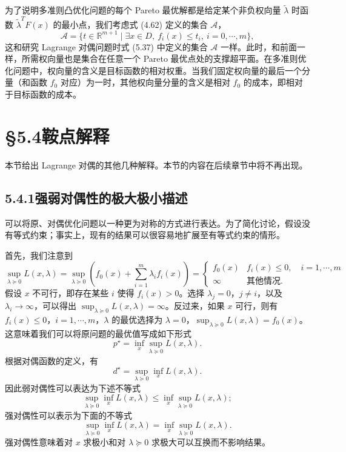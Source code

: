 \documentclass[UTF8, 12pt, fontset=fandol, oneside]{ctexart}
\begin{document}
为了说明多准则凸优化问题的每个 Pareto 最优解都是给定某个非负权向量 $\tilde{\lambda}$ 时函数 $\tilde{\lambda}^TF(x)$ 的最小点，我们考虑式 (4.62) 定义的集合 $\mathcal{A}$，
\[
\mathcal{A}=\{t\in\mathbb{R}^{m+1}\mid \exists x\in D,\ f_i(x)\leq t_i,\ i=0,\cdots,m\},
\]
这和研究 Lagrange 对偶问题时式 (5.37) 中定义的集合 $\mathcal{A}$ 一样。此时，和前面一样，所需权向量也是集合在任意一个 Pareto 最优点处的支撑超平面。在多准则优化问题中，权向量的含义是目标函数的相对权重。当我们固定权向量的最后一个分量（和函数 $f_0$ 对应）为一时，其他权向量分量的含义是相对 $f_0$ 的成本，即相对于目标函数的成本。

\section*{§5.4\quad 鞍点解释}

本节给出 Lagrange 对偶的其他几种解释。本节的内容在后续章节中将不再出现。

\subsection*{5.4.1\quad 强弱对偶性的极大极小描述}

可以将原、对偶优化问题以一种更为对称的方式进行表达。为了简化讨论，假设没有等式约束；事实上，现有的结果可以很容易地扩展至有等式约束的情形。

首先，我们注意到
\[
\sup_{\lambda\succeq 0}L(x,\lambda)
=\sup_{\lambda\succeq 0}\left(f_0(x)+\sum_{i=1}^m\lambda_i f_i(x)\right)
=
\begin{cases}
f_0(x) & f_i(x)\leq 0,\quad i=1,\cdots,m\\
\infty & \text{其他情况}.
\end{cases}
\]
假设 $x$ 不可行，即存在某些 $i$ 使得 $f_i(x)>0$。选择 $\lambda_j=0$，$j\neq i$，以及 $\lambda_i\to\infty$，可以得出 $\sup_{\lambda\succeq 0}L(x,\lambda)=\infty$。反过来，如果 $x$ 可行，则有 $f_i(x)\leq 0$，$i=1,\cdots,m$，$\lambda$ 的最优选择为 $\lambda=0$，$\sup_{\lambda\succeq 0}L(x,\lambda)=f_0(x)$。这意味着我们可以将原问题的最优值写成如下形式
\[
p^\star=\inf_x\sup_{\lambda\succeq 0}L(x,\lambda).
\]
根据对偶函数的定义，有
\[
d^\star=\sup_{\lambda\succeq 0}\inf_x L(x,\lambda).
\]
因此弱对偶性可以表达为下述不等式
\begin{equation}
\sup_{\lambda\succeq 0}\inf_x L(x,\lambda)
\leq
\inf_x\sup_{\lambda\succeq 0}L(x,\lambda);
\tag{5.45}
\end{equation}
强对偶性可以表示为下面的不等式
\[
\sup_{\lambda\succeq 0}\inf_x L(x,\lambda)
=
\inf_x\sup_{\lambda\succeq 0}L(x,\lambda).
\]
强对偶性意味着对 $x$ 求极小和对 $\lambda\succeq 0$ 求极大可以互换而不影响结果。
\end{document}
